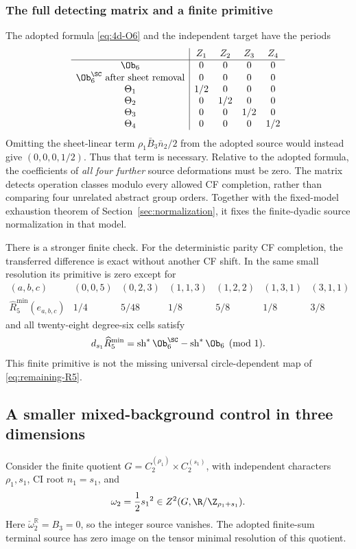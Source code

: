 \subsubsection{The full detecting matrix and a finite primitive}
The adopted formula \eqref{eq:4d-O6} and the independent target have the periods
\begin{equation}\label{eq:calperiod04}
\begin{array}{c|cccc}
&Z_1&Z_2&Z_3&Z_4\\\hline
\Ob_6&0&0&0&0\\
\Ob_6^{\SC}\text{ after sheet removal}&0&0&0&0\\
\Theta_1&1/2&0&0&0\\
\Theta_2&0&1/2&0&0\\
\Theta_3&0&0&1/2&0\\
\Theta_4&0&0&0&1/2
\end{array}
\end{equation}
Omitting the sheet-linear term $\rho_1\bar B_3\bar n_2/2$ from the adopted source would instead give $(0,0,0,1/2)$. Thus that term is necessary. Relative to the adopted formula, the coefficients of \emph{all four further} source deformations must be zero. The matrix detects operation classes modulo every allowed CF completion, rather than comparing four unrelated abstract group orders. Together with the fixed-model exhaustion theorem of Section~\ref{sec:normalization}, it fixes the finite-dyadic source normalization in that model.

There is a stronger finite check. For the deterministic parity CF completion, the transferred difference is exact without another CF shift. In the same small resolution its primitive is zero except for
\begin{equation}\label{eq:minprimitive04}
\begin{array}{c|rrrrrr}
(a,b,c)&(0,0,5)&(0,2,3)&(1,1,3)&(1,2,2)&(1,3,1)&(3,1,1)\\\hline
\widehat R_5^{\mathrm{min}}(e_{a,b,c})&1/4&5/48&1/8&5/8&1/8&3/8
\end{array}
\end{equation}
and all twenty-eight degree-six cells satisfy
\begin{equation}\label{eq:finite-primitive}
 d_{s_1}\widehat R_5^{\mathrm{min}}
 =\operatorname{sh}^*\Ob_6^{\SC}-\operatorname{sh}^*\Ob_6\pmod1.
\end{equation}
This finite primitive is not the missing universal circle-dependent map of \eqref{eq:remaining-R5}.

\subsection{A smaller mixed-background control in three dimensions}\label{subsec:mixed3}
Consider the finite quotient $G=C_2^{({\rho_1})}\times C_2^{({s_1})}$, with independent characters ${\rho_1},{s_1}$, CI root ${n_1}={s_1}$, and
\begin{equation}
\omega_2=\frac12{s_1}^2\in Z^2(G,\R/\Z_{{\rho_1}+{s_1}}).
\end{equation}
Here $\check\omega_2^{\mathbb R}=B_3=0$, so the integer source vanishes. The adopted finite-sum terminal source has zero image on the tensor minimal resolution of this quotient.

